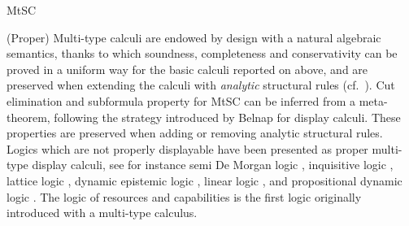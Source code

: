 \begin{entry}{MtSC}
\begin{history}
\end{history}

\begin{technicalities}
(Proper) Multi-type calculi are endowed by design with a natural algebraic semantics, thanks to which soundness, completeness and conservativity can be proved in a uniform way for the basic calculi reported on above, and are preserved when extending the calculi with {\em analytic} structural rules (cf.~\cite[Definition 4]{GrecoMaPalmigianoTzimoulisZhao2016}). 
Cut elimination and subformula property for MtSC can be inferred from a meta-theorem, following the strategy introduced by Belnap for display calculi. These properties are preserved when adding or removing analytic structural rules. Logics which are not properly displayable have been presented as proper multi-type display calculi, see for instance semi De Morgan logic , inquisitive logic , lattice logic , dynamic epistemic logic , linear logic \cite{GrecoPalmigiano}, and propositional dynamic logic \cite{FrittellaGrecoKurzPalmigiano2016}. 
The logic of resources and capabilities \cite{BilkovaGrecoPalmigianoTzimoulisWijnberg} is the first logic  originally introduced with a multi-type calculus. 

\end{technicalities}

\end{entry}
